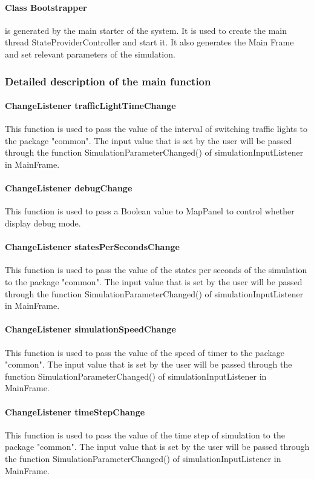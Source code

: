 \documentclass[a4paper,12pt]{article}
\begin{document}
\paragraph{Class Bootstrapper} is generated by the main starter of the system. It is used to create the main thread StateProviderController and start it. It also generates the Main Frame and set relevant parameters of the simulation.


\subsubsection{Detailed description of the main function}

\paragraph{ChangeListener trafficLightTimeChange} This function is used to pass the value of the interval of switching traffic lights to the package "common". The input value that is set by the user will be passed through the function SimulationParameterChanged() of simulationInputListener in MainFrame.
\paragraph{ChangeListener debugChange} This function is used to pass a Boolean value to MapPanel to control whether display debug mode. 
\paragraph{ChangeListener statesPerSecondsChange} This function is used to pass the value of the states per seconds of the simulation to the package "common". The input value that is set by the user will be passed through the function SimulationParameterChanged() of simulationInputListener in MainFrame.
\paragraph{ChangeListener simulationSpeedChange} This function is used to pass the value of the speed of timer to the package "common". The input value that is set by the user will be passed through the function SimulationParameterChanged() of simulationInputListener in MainFrame.
\paragraph{ChangeListener timeStepChange}This function is used to pass the value of the time step of simulation to the package "common". The input value that is set by the user will be passed through the function SimulationParameterChanged() of simulationInputListener in MainFrame.
\end{document}
